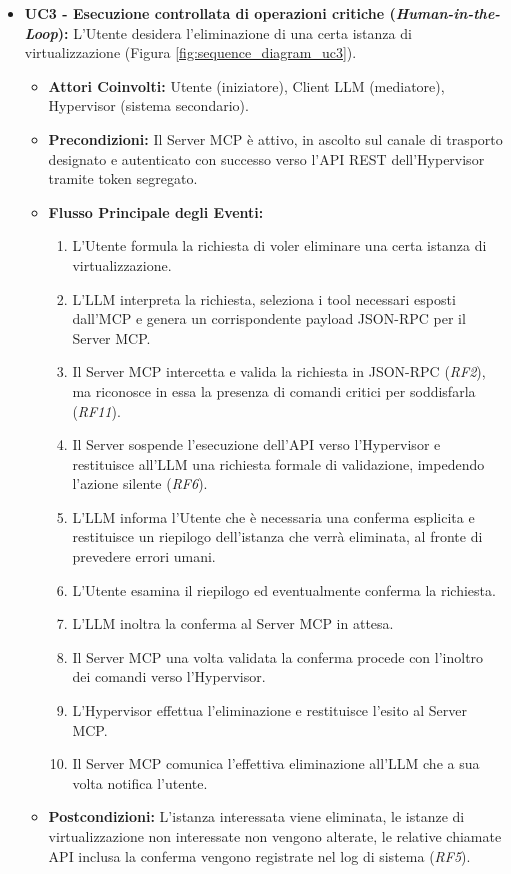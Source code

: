 \begin{itemize}
    \item \textbf{UC3 - Esecuzione controllata di operazioni critiche (\textit{Human-in-the-Loop}):}
    L'Utente desidera l'eliminazione di una certa istanza di virtualizzazione (Figura \ref{fig:sequence_diagram_uc3}).
    \begin{itemize}
        \item \textbf{Attori Coinvolti:} Utente (iniziatore), Client LLM (mediatore), Hypervisor (sistema secondario).
        \item \textbf{Precondizioni:} Il Server MCP è attivo, in ascolto sul canale di trasporto designato e autenticato con successo verso l'API REST dell'Hypervisor tramite token segregato.
        \item \textbf{Flusso Principale degli Eventi:}
        \begin{enumerate}
            \item L'Utente formula la richiesta di voler eliminare una certa istanza di virtualizzazione.
            \item L'LLM interpreta la richiesta, seleziona i tool necessari esposti dall'MCP e genera un corrispondente payload JSON-RPC per il Server MCP.
            \item Il Server MCP intercetta e valida la richiesta in JSON-RPC (\textit{RF2}), ma riconosce in essa la presenza di comandi critici per soddisfarla (\textit{RF11}).
            \item Il Server sospende l'esecuzione dell'API verso l'Hypervisor e restituisce all'LLM una richiesta formale di validazione, impedendo l'azione silente (\textit{RF6}).
            \item L'LLM informa l'Utente che è necessaria una conferma esplicita e restituisce un riepilogo dell'istanza che verrà eliminata, al fronte di prevedere errori umani.
            \item L'Utente esamina il riepilogo ed eventualmente conferma la richiesta.
            \item L'LLM inoltra la conferma al Server MCP in attesa.
            \item Il Server MCP una volta validata la conferma procede con l'inoltro dei comandi verso l'Hypervisor.
            \item L'Hypervisor effettua l'eliminazione e restituisce l'esito al Server MCP.
            \item Il Server MCP comunica l'effettiva eliminazione all'LLM che a sua volta notifica l'utente.
        \end{enumerate}
        \item \textbf{Postcondizioni:} L'istanza interessata viene eliminata, le istanze di virtualizzazione non interessate non vengono alterate, le relative chiamate API inclusa la conferma vengono registrate nel log di sistema (\textit{RF5}).
    \end{itemize}
\end{itemize}

